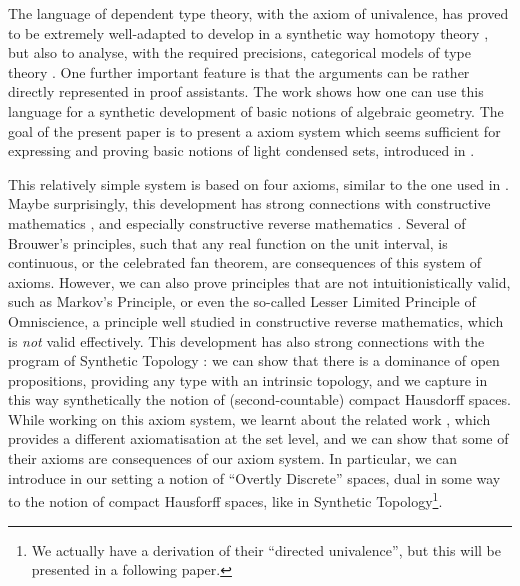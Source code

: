 The language of dependent type theory, with the axiom of univalence, has proved to be extremely well-adapted to
develop in a synthetic way homotopy theory \cite{hott}, but
also to analyse, with the required precisions, categorical models of type theory \cite{vanderweide2024}. One
further important feature is that
the arguments can be rather directly represented in proof assistants. The work \cite{draft} shows how one can use
this language for a synthetic development of basic notions of algebraic geometry. The goal of the present paper
is to present a axiom system which seems sufficient for expressing and proving basic notions of light condensed
sets, introduced in \cite{Scholze}.

This relatively simple system is based on four axioms, similar to the one used
in \cite{draft}. Maybe surprisingly, this development has strong connections with constructive mathematics \cite{Bishop},
and especially constructive reverse mathematics \cite{ReverseMathsBishop,HannesDiener}. Several of Brouwer's principles, such that
any real function on the unit interval, is continuous, or the celebrated fan theorem, are consequences of this system
of axioms. However, we can also prove principles that are not intuitionistically valid, such as Markov's Principle,
or even the so-called Lesser Limited Principle of Omniscience, a principle well studied in constructive reverse mathematics,
which is {\em not} valid effectively.  This development has also strong connections with the program of Synthetic
Topology \cite{SyntheticTopologyEscardo,SyntheticTopologyLesnik}:
we can show that there is a dominance of open propositions, providing any type with an intrinsic
topology, and we capture in this way synthetically the notion of (second-countable) compact Hausdorff spaces.
While working on this axiom system, we learnt about the related work \cite{bc24}, which provides a different axiomatisation
at the set level, and we can show that some of their axioms are consequences of our axiom system. In particular, we can introduce
in our setting a notion of ``Overtly Discrete'' spaces, dual in some way to the notion of compact Hausforff spaces, like
in Synthetic Topology\footnote{We actually have a
derivation of their ``directed univalence'', but this will be presented in a following paper.}.


